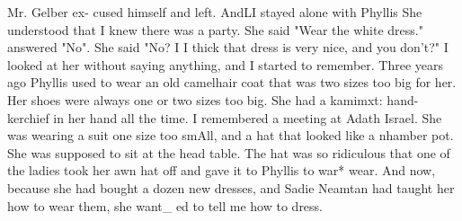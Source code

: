 Mr.
Gelber ex-
cused himself and left.
AndLI stayed alone with Phyllis 
She understood that I knew there was a party.
She said "Wear the white dress."
answered "No".
She said "No?
I I thick that dress is very nice, and you don't?"
I 
looked at her without saying anything, and I started to remember.
Three years ago Phyllis used to wear an old camelhair coat that was two sizes too 
big for her.
Her shoes were always one or two sizes too big.
She had a kamimxt: hand-
kerchief in her hand all the time.
I remembered a meeting at Adath Israel.
She was 
wearing a suit one size too smAll, and a hat that looked like a nhamber pot.
She was 
supposed to sit at the head table.
The hat was so ridiculous that one of the ladies 
took her awn hat off and gave it to Phyllis to war* wear.
And now, because she had 
bought a dozen new dresses, and Sadie Neamtan had taught her how to wear them, she want_ 
ed to tell me how to dress.